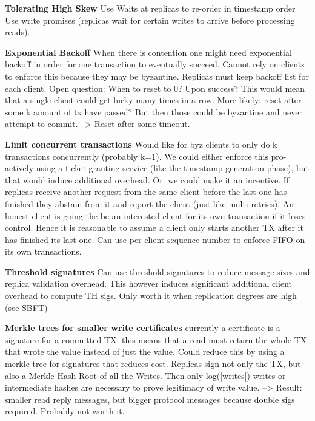 \textbf{Tolerating High Skew}
Use Waits at replicas to re-order in timestamp order
Use write promises (replicas wait for certain writes to arrive before processing reads).


\textbf{Exponential Backoff}
When there is contention one might need exponential backoff in order for one transaction to eventually succeed. Cannot rely on clients to enforce this because they may be byzantine. Replicas must keep backoff list for each client.
Open question: When to reset to 0? Upon success? This would mean that a single client could get lucky many times in a row. More likely: reset after some k amount of tx have passed? But then those could be byzantine and never attempt to commit. --> Reset after some timeout.


\textbf{Limit concurrent transactions}
Would like for byz clients to only do k transactions concurrently (probably k=1). We could either enforce this pro-actively using a ticket granting service (like the timestamp generation phase), but that would induce additional overhead. Or: we could make it an incentive. If replicas receive another request from the same client before the last one has finished they abstain from it and report the client (just like multi retries). An honest client is going the be an interested client for its own transaction if it loses control. Hence it is reasonable to assume a client only starts another TX after it has finished its last one. Can use per client sequence number to enforce FIFO on its own transactions.

\textbf{Threshold signatures}
Can use threshold signatures to reduce message sizes and replica validation overhead. This however induces significant additional client overhead to compute TH sigs. Only worth it when replication degrees are high (see SBFT)

\textbf{Merkle trees for smaller write certificates}
currently a certificate is a signature for a committed TX. this means that a read must return the whole TX that wrote the value instead of just the value. Could reduce this by using a merkle tree for signatures that reduces cost.
Replicas sign not only the TX, but also a Merkle Hash Root of all the Writes. Then only log(|writes|) writes or intermediate hashes are necessary to prove legitimacy of write value.
--> Result: smaller read reply messages, but bigger protocol messages because double sigs required. Probably not worth it.

